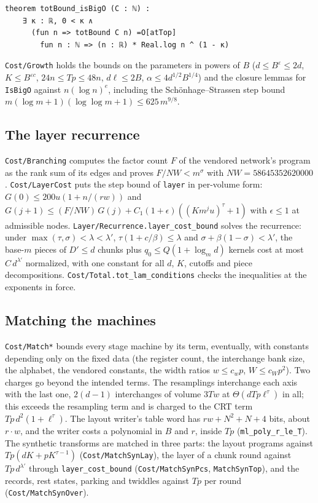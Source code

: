 \documentclass[11pt]{amsart}
\theoremstyle{remark}
\begin{document}
\begin{lstlisting}
theorem totBound_isBigO (C : ℕ) :
    ∃ κ : ℝ, 0 < κ ∧
      (fun n => totBound C n) =O[atTop]
        fun n : ℕ => (n : ℝ) * Real.log n ^ (1 - κ)
\end{lstlisting}

\texttt{Cost/Growth} holds the bounds on the parameters in powers of $B$ ($d\le B^\varepsilon\le
2d$, $K\le B^{\varepsilon c}$, $24n\le Tp\le 48n$, $d\ell\le 2B$, $\alpha\le 4d^{1/2}B^{1/4}$)
and the closure lemmas for \texttt{IsBigO} against $n(\log n)^e$, including the
Schönhage--Strassen step bound $m(\log m+1)(\log\log m+1)\le 625\,m^{9/8}$.

\subsection*{The layer recurrence}
\texttt{Cost/Branching} computes the factor count $F$ of the vendored network's program as the
rank sum of its edges and proves $F/NW<m^\sigma$ with $NW=58645352620000$.
\texttt{Cost/LayerCost} puts the step bound of \texttt{layer} in per-volume form:
$G(0)\le 200u(1+n/(rw))$ and
$G(j+1)\le (F/NW)\,G(j)+C_1(1+\epsilon)((Km^ju)^\tau+1)$ with $\epsilon\le1$ at admissible
nodes. \texttt{Layer/Recurrence.layer\_cost\_bound} solves the recurrence: under
$\max(\tau,\sigma)<\lambda<\lambda'$, $\tau(1+c/\beta)\le\lambda$ and
$\sigma+\beta(1-\sigma)<\lambda'$, the base-$m$ pieces of $D'\le d$ chunks plus
$q_0\le Q(1+\log_md)$ kernels cost at most $C\,d^{\lambda'}$ normalized, with one constant for
all $d$, $K$, cutoffs and piece decompositions. \texttt{Cost/Total.tot\_lam\_conditions}
checks the inequalities at the exponents in force.

\subsection*{Matching the machines}
\texttt{Cost/Match*} bounds every stage machine by its term, eventually, with constants
depending only on the fixed data (the register count, the interchange bank size, the alphabet,
the vendored constants, the width ratios $w\le c_wp$, $W\le c_Wp^2$). Two charges go beyond
the intended terms. The resamplings interchange each axis with the last one, $2(d-1)$
interchanges of volume $3Tw$ at $\Theta(dTp\ell^\tau)$ in all; this exceeds the resampling
term and is charged to the CRT term $Tp\,d^2(1+\ell^\tau)$. The layout writer's table word has
$rw+N^2+N+4$ bits, about $r\cdot w$, and the writer costs a polynomial in $B$ and $r$, inside
$Tp$ (\texttt{ml\_poly\_r\_le\_T}). The synthetic transforms are matched in three parts: the
layout programs against $Tp(dK+pK^{\tau-1})$ (\texttt{Cost/MatchSynLay}), the layer of a chunk
round against $Tp\,d^{\lambda'}$ through \texttt{layer\_cost\_bound}
(\texttt{Cost/MatchSynPcs}, \texttt{MatchSynTop}), and the records, rest states, parking and
twiddles against $Tp$ per round (\texttt{Cost/MatchSynOver}).
\end{document}
